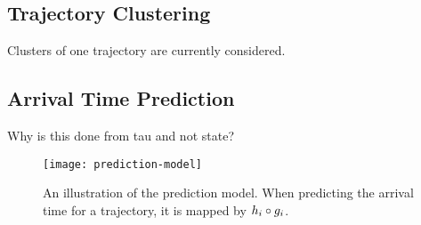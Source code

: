 \subsection{Trajectory Clustering}
Clusters of one trajectory are currently considered.

\subsection{Arrival Time Prediction}
Why is this done from tau and not state?
\begin{figure}
  \centering
  \texttt{[image: prediction-model]}
  \caption{An illustration of the prediction model. When predicting
    the arrival time for a trajectory, 
    it is mapped by $h_i \circ g_i$.}\label{fig:synch-model}
\end{figure}